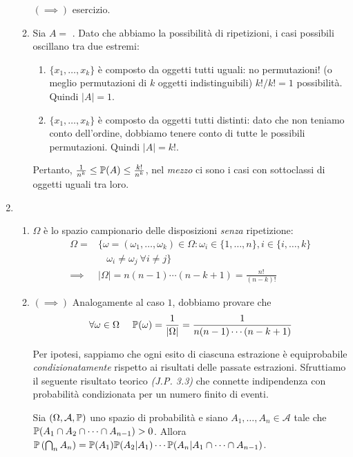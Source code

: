 \begin{enumerate}
\begin{enumerate}
		$(\implies)$ esercizio.
		\item Sia $A=$ . Dato che abbiamo la possibilità di ripetizioni, i casi possibili oscillano tra due estremi:
		\begin{enumerate}
			\item $\{x_{1},\dots,x_{k}\}$ è composto da oggetti tutti uguali: no permutazioni! (o meglio permutazioni di $k$ oggetti indistinguibili) $k!/k!=1$ possibilità. Quindi $| A| =1$.
			\item $\{x_{1},\dots,x_{k}\}$ è composto da oggetti tutti distinti: dato che non teniamo conto dell'ordine, dobbiamo tenere conto di tutte le possibili permutazioni. Quindi $| A| =k!$.
		\end{enumerate}

		Pertanto, $\frac{1}{n^{k}} \leq \mathbb{P}(A) \leq \frac{k!}{n^{k}}$, nel \textit{mezzo} ci sono i casi con sottoclassi di oggetti uguali tra loro.
	\end{enumerate}
	\item 
	\begin{enumerate}
		\item $\Omega $ è lo spazio campionario delle disposizioni \textit{senza} ripetizione:
		\begin{align*}
			\Omega = & \{\omega =(\omega_{1} ,\dots ,\omega_{k}) \in \Omega :\omega_{i} \in \{1,\dots,n\} ,i\in \{i,\dots,k\}\\
			 & \ \ \ \ \omega_{i} \neq \omega_{j} \ \forall i\neq j\}\\
			\implies  & | \Omega | =n(n-1) \cdots (n-k+1) =\frac{n!}{(n-k) !}
		\end{align*}
		\item $(\implies)$ Analogamente al caso $1$, dobbiamo provare che
		\begin{equation*}
			\forall \omega \in \Omega \ \ \ \ \mathbb{P}(\omega) =\frac{1}{| \Omega | } =\frac{1}{n(n-1) \cdots (n-k+1)}
		\end{equation*}

		Per ipotesi, sappiamo che ogni esito di ciascuna estrazione è equiprobabile \textit{condizionatamente} rispetto ai risultati delle passate estrazioni. Sfruttiamo il seguente risultato teorico \textit{(J.P. 3.3)} che connette indipendenza con probabilità condizionata per un numero finito di eventi.

		Sia $(\Omega ,\mathcal{A} ,\mathbb{P})$ uno spazio di probabilità e siano $A_{1} ,\dots ,A_{n} \in \mathcal{A}$ tale che $\mathbb{P}(A_{1} \cap A_{2} \cap \cdots \cap A_{n-1})  >0$. Allora $\mathbb{P}\left(\bigcap_{n} A_{n}\right) =\mathbb{P}(A_{1})\mathbb{P}(A_{2} |A_{1}) \cdots \mathbb{P}(A_{n} |A_{1} \cap \cdots \cap A_{n-1})$.


\end{enumerate}
\end{enumerate}
